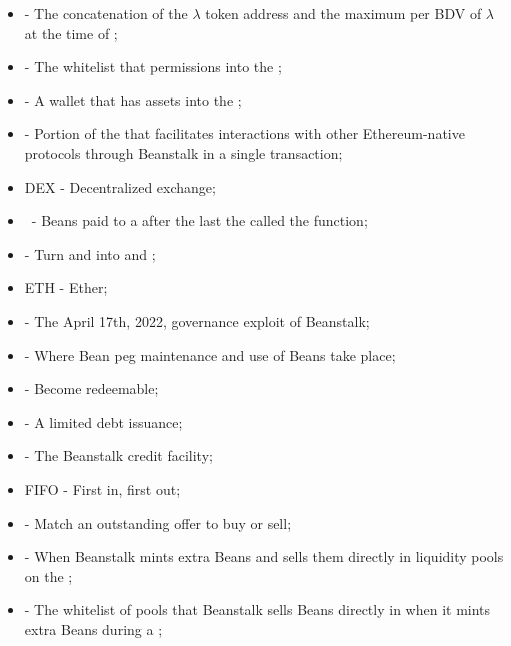 \documentclass[class=article, crop=false]{standalone}
\begin{document}
\begin{itemize}[topsep=0pt, itemsep=3pt,leftmargin=16pt]
    \item[]  - The concatenation of the \hyperlink{ht126}{$\lambda$} token address and the maximum   per BDV of \hyperlink{ht126}{$\lambda$} at the time of ;
    \item[]  - \hypertarget{ht46}{The whitelist that permissions  into the };
    \item[]  - \hypertarget{ht47}{A wallet that has  assets into the };
    \item[]  - \hypertarget{ht48}{Portion of the  that facilitates interactions with other Ethereum-native protocols through Beanstalk in a single transaction};
    \item[] DEX - Decentralized exchange;
    \item[]  \Bean\ - \hypertarget{ht79}{Beans paid to a  after the last  the  called the  function};
    \item[]  - \hypertarget{ht80}{Turn  and  into  and };
    \item[] ETH - \hypertarget{ht81}{Ether};
    \item[]  - \hypertarget{ht82}{The April 17th, 2022, governance exploit of Beanstalk};
    \item[]  - \hypertarget{ht86}{Where Bean peg maintenance and use of Beans take place};
    \item[]  - \hypertarget{ht87}{Become redeemable};
    \item[]  - \hypertarget{ht88}{A limited debt issuance};
    \item[]  - \hypertarget{ht89}{The Beanstalk credit facility};
    \item[] FIFO - \hypertarget{ht89}{First in, first out};
    \item[]  - \hypertarget{ht90}{Match an outstanding offer to buy or sell};
    \item[]  - \hypertarget{ht91}{When Beanstalk mints extra Beans and sells them directly in liquidity pools on the };
    \item[]  - The whitelist of pools that Beanstalk sells Beans directly in when it mints extra Beans during a ;

\end{itemize}
\end{document}
